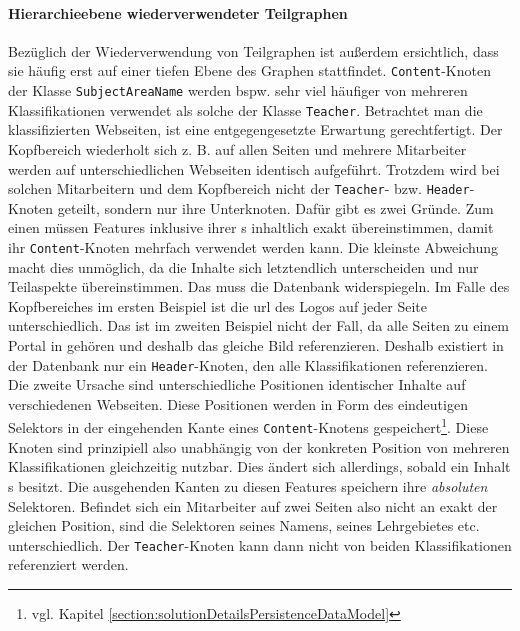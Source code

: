     \paragraph{Hierarchieebene wiederverwendeter Teilgraphen}
    Bezüglich der Wiederverwendung von Teilgraphen ist außerdem ersichtlich,
    dass sie häufig erst auf einer tiefen Ebene des Graphen stattfindet.
    \texttt{Content}-Knoten der Klasse \texttt{SubjectAreaName} werden bspw.
    sehr viel häufiger von mehreren Klassifikationen verwendet als solche der
    Klasse \texttt{Teacher}.
    Betrachtet man die klassifizierten Webseiten,
    ist eine entgegengesetzte Erwartung gerechtfertigt.
    Der Kopfbereich wiederholt sich z. B. auf allen Seiten
    und mehrere Mitarbeiter werden auf unterschiedlichen Webseiten identisch aufgeführt.
    Trotzdem wird bei solchen Mitarbeitern und dem Kopfbereich
    nicht der \texttt{Teacher}- bzw. \texttt{Header}-Knoten geteilt,
    sondern nur ihre Unterknoten.
    Dafür gibt es zwei Gründe.
    Zum einen müssen Features inklusive ihrer {\childFeature}s inhaltlich
    exakt übereinstimmen, damit ihr \texttt{Content}-Knoten mehrfach verwendet werden kann.
    Die kleinste Abweichung macht dies unmöglich,
    da die Inhalte sich letztendlich unterscheiden und nur Teilaspekte übereinstimmen.
    Das muss die Datenbank widerspiegeln.
    Im Falle des Kopfbereiches im ersten Beispiel ist die \gls{url} des Logos
    auf jeder Seite unterschiedlich.
    Das ist im zweiten Beispiel nicht der Fall,
    da alle Seiten zu einem Portal in {\wordpress} gehören
    und deshalb das gleiche Bild referenzieren.
    Deshalb existiert in der Datenbank nur ein \texttt{Header}-Knoten,
    den alle Klassifikationen referenzieren.
    Die zweite Ursache sind unterschiedliche Positionen identischer Inhalte
    auf verschiedenen Webseiten.
    Diese Positionen werden in Form des eindeutigen Selektors in der eingehenden
    Kante eines \texttt{Content}-Knotens gespeichert\footnote{vgl. Kapitel \ref{section:solutionDetailsPersistenceDataModel}}.
    Diese Knoten sind prinzipiell also unabhängig von der konkreten Position
    von mehreren Klassifikationen gleichzeitig nutzbar.
    Dies ändert sich allerdings, sobald ein Inhalt {\childFeature}s besitzt.
    Die ausgehenden Kanten zu diesen Features speichern ihre \textit{absoluten} Selektoren.
    Befindet sich ein Mitarbeiter auf zwei Seiten also nicht an exakt der gleichen Position,
    sind die Selektoren seines Namens, seines Lehrgebietes etc. unterschiedlich.
    Der \texttt{Teacher}-Knoten kann dann nicht von beiden Klassifikationen referenziert
    werden.
    
